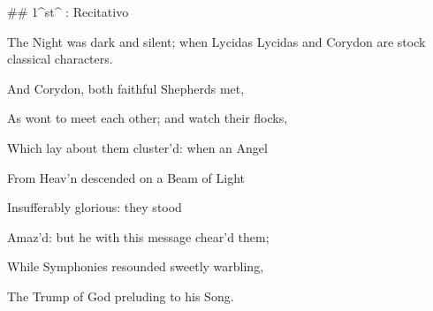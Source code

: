 ## 1^st^ \mvmt: Recitativo

\beginnumbering
\pstart
The Night was dark and silent; when Lycidas {Lycidas and Corydon are stock classical characters.}


And Corydon, both faithful Shepherds met, 

As wont to meet each other; and watch their flocks, 

Which lay about them cluster’d: when an Angel 

From Heav’n descended on a Beam of Light 

Insufferably glorious: they stood 

Amaz’d: but he with this message chear’d them; 

While Symphonies resounded sweetly warbling, 

The Trump of God preluding to his Song.
\pend
\endnumbering
